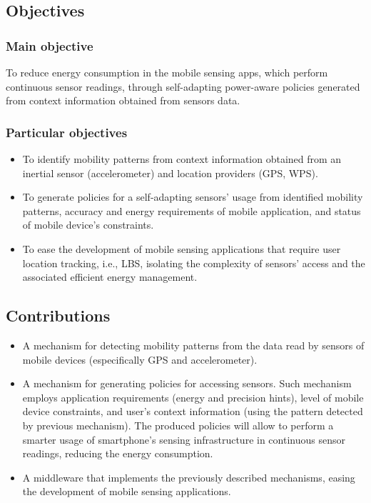 \documentclass[12pt]{article}
\numberwithin{equation}{section}
\numberwithin{table}{section}
\numberwithin{figure}{section}
\begin{document}
\subsection{Objectives} 
\label{sub:objectives}

\subsubsection*{Main objective}
\label{ssub:main_objective}
To reduce energy consumption in the mobile sensing apps, which perform continuous sensor readings, through self-adapting power-aware policies generated from context information obtained from sensors data.

\subsubsection*{Particular objectives} 
\label{ssub:particular_objectives}
\begin{itemize}
  \item To identify mobility patterns from context information obtained from an inertial sensor (accelerometer) and location providers (GPS, WPS).
  \item To generate policies for a self-adapting sensors' usage from identified mobility patterns, accuracy and energy requirements of mobile application, and status of mobile device's constraints. 
  \item To ease the development of mobile sensing applications that require user location tracking, i.e., LBS, isolating the complexity of sensors' access and the associated efficient energy management.
\end{itemize}


\subsection{Contributions} 
\label{sub:contributions}

\begin{itemize}
  \item A mechanism for detecting mobility patterns from the data read by sensors of mobile devices (especifically GPS and accelerometer).
  \item A mechanism for generating policies for accessing sensors.
  Such mechanism employs application requirements (energy and precision hints), level of mobile device constraints, and user's context information (using the pattern detected by previous mechanism).
  The produced policies will allow to perform a smarter usage of smartphone's sensing infrastructure in continuous sensor readings, reducing the energy consumption.
  \item A middleware that implements the previously described mechanisms, easing the development of mobile sensing applications.
\end{itemize}
\end{document}
